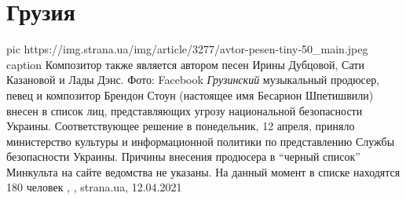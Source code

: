  
 
 
 
 
\chapter{Грузия}
\label{sec:slova.gruzia}

\ifcmt
  pic https://img.strana.ua/img/article/3277/avtor-pesen-tiny-50_main.jpeg
	caption Композитор также является автором песен Ирины Дубцовой, Сати Казановой и Лады Дэнс. Фото: Facebook 
\fi
\emph{Грузинский} музыкальный продюсер, певец и композитор Брендон Стоун
(настоящее имя Бесарион Шпетишвили) внесен в список лиц, представляющих угрозу
национальной безопасности Украины.  Соответствующее решение в понедельник, 12
апреля, приняло министерство культуры и информационной политики по
представлению Службы безопасности Украины.  Причины внесения продюсера в
\enquote{черный список} Минкульта на сайте ведомства не указаны. На данный
момент в списке находятся 180 человек
, , strana.ua, 12.04.2021

